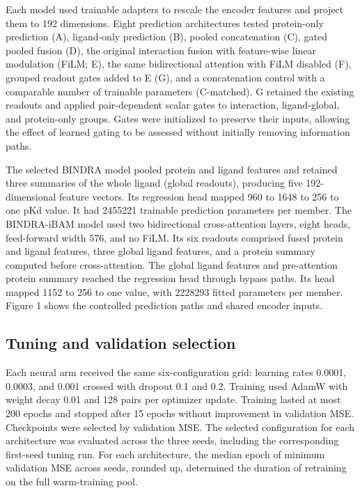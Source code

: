\documentclass[12pt,a4paper]{article}
\begin{document}
Each model used trainable adapters to rescale the encoder features and project them to 192 dimensions. Eight prediction architectures tested protein-only prediction (A), ligand-only prediction (B), pooled concatenation (C), gated pooled fusion (D), the original interaction fusion with feature-wise linear modulation (FiLM; E), the same bidirectional attention with FiLM disabled (F), grouped readout gates added to E (G), and a concatenation control with a comparable number of trainable parameters (C-matched). G retained the existing readouts and applied pair-dependent scalar gates to interaction, ligand-global, and protein-only groups. Gates were initialized to preserve their inputs, allowing the effect of learned gating to be assessed without initially removing information paths.

The selected BINDRA model pooled protein and ligand features and retained three summaries of the whole ligand (global readouts), producing five 192-dimensional feature vectors. Its regression head mapped 960 to 1648 to 256 to one pKd value. It had 2455221 trainable prediction parameters per member. The BINDRA-iBAM model used two bidirectional cross-attention layers, eight heads, feed-forward width 576, and no FiLM. Its six readouts comprised fused protein and ligand features, three global ligand features, and a protein summary computed before cross-attention. The global ligand features and pre-attention protein summary reached the regression head through bypass paths. Its head mapped 1152 to 256 to one value, with 2228293 fitted parameters per member. Figure 1 shows the controlled prediction paths and shared encoder inputs.

\subsection*{Tuning and validation selection}
Each neural arm received the same six-configuration grid: learning rates 0.0001, 0.0003, and 0.001 crossed with dropout 0.1 and 0.2. Training used AdamW with weight decay 0.01 and 128 pairs per optimizer update. Training lasted at most 200 epochs and stopped after 15 epochs without improvement in validation MSE. Checkpoints were selected by validation MSE. The selected configuration for each architecture was evaluated across the three seeds, including the corresponding first-seed tuning run. For each architecture, the median epoch of minimum validation MSE across seeds, rounded up, determined the duration of retraining on the full warm-training pool.
\end{document}
